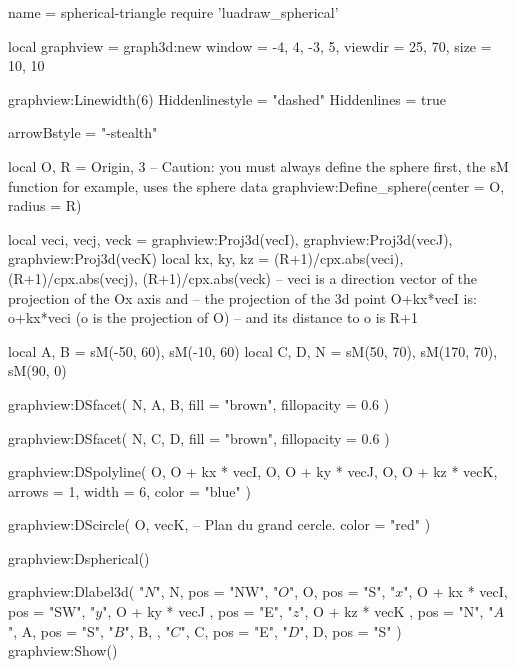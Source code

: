 \documentclass{standalone}
\begin{document}
\begin{luadraw}{name = spherical-triangle}
require 'luadraw_spherical'

local graphview = graph3d:new{
  window  = {-4, 4, -3, 5},
  viewdir = {25, 70},
  size    = {10, 10}
}

graphview:Linewidth(6)
Hiddenlinestyle = "dashed"
Hiddenlines     = true

arrowBstyle = "-stealth"

local O, R =  Origin, 3
-- Caution: you must always define the sphere first, the sM function for example, uses the sphere data
graphview:Define_sphere({center = O, radius = R})

local veci, vecj, veck = graphview:Proj3d(vecI), graphview:Proj3d(vecJ), graphview:Proj3d(vecK)
local kx, ky, kz = (R+1)/cpx.abs(veci), (R+1)/cpx.abs(vecj), (R+1)/cpx.abs(veck)
-- veci is a direction vector of the projection of the Ox axis and 
-- the projection of the 3d point O+kx*vecI is: o+kx*veci (o is the projection of O) 
-- and its distance to o is R+1

local A, B = sM(-50, 60), sM(-10, 60)
local C, D, N = sM(50, 70), sM(170, 70), sM(90, 0)

graphview:DSfacet(
  {N, A, B},
  {fill = "brown", fillopacity = 0.6}
)

graphview:DSfacet(
  {N, C, D},
  {fill = "brown", fillopacity = 0.6}
)

graphview:DSpolyline(
  {
    {O, O + kx * vecI},
    {O, O + ky * vecJ},
    {O, O + kz * vecK}},
    {arrows = 1, width = 6, color = "blue"}
)

graphview:DScircle(
  {O, vecK},       -- Plan du grand cercle.
  {color = "red"}
)

graphview:Dspherical()

graphview:Dlabel3d(
  "$N$", N, {pos = "NW"},
  "$O$", O, {pos = "S"},
  "$x$", O + kx * vecI, {pos = "SW"},
  "$y$", O + ky * vecJ , {pos = "E"},
  "$z$", O + kz * vecK , {pos = "N"},
  "$A$", A, {pos = "S"},
  "$B$", B, {},
  "$C$", C, {pos = "E"},
  "$D$", D, {pos = "S"}
)
graphview:Show()
\end{luadraw}
\end{document}

